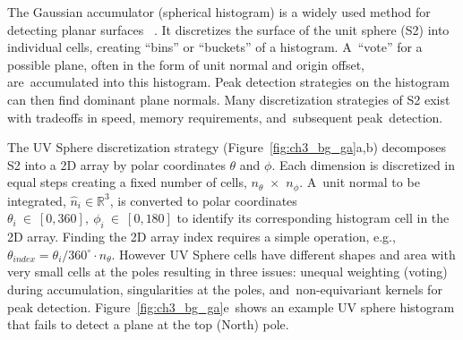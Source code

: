 The Gaussian accumulator (spherical histogram) is a widely used method for detecting planar surfaces ~\cite{borrmann_3d_2011}. It discretizes the surface of the unit sphere (S2) into individual cells, creating ``bins'' or ``buckets'' of a histogram. A~``vote'' for a possible plane, often in the form of unit normal and origin offset, are~accumulated into this histogram. Peak detection strategies on the histogram can then find dominant plane normals. Many discretization strategies of S2 exist with tradeoffs in speed, memory requirements, and~subsequent peak~detection.


The UV Sphere discretization strategy (Figure~\ref{fig:ch3_bg_ga}a,b) decomposes S2 into a 2D array by polar coordinates $\theta$ and $\phi$. Each dimension is discretized in equal steps creating a fixed number of cells, $n_{\theta}$~$\times$~$n_{\phi}$. A~unit normal to be integrated, $\hat{n}_i \in \mathbb{R}^3$, is converted to polar coordinates $\theta_i~\in~[0, 360],~\phi_i~\in~[0, 180]$ to identify its corresponding histogram cell in the 2D array. Finding the 2D array index requires a simple operation, e.g.,~ $\theta_{index} = \theta_i / 360^{\circ} \cdot n_{\theta}$. However UV Sphere cells have different shapes and area with very small cells at the poles resulting in three issues: unequal weighting (voting) during accumulation,  singularities at the poles, and~non-equivariant kernels for peak detection. Figure~\ref{fig:ch3_bg_ga}e~shows an example UV sphere histogram that fails to detect a plane at the top (North) pole.

